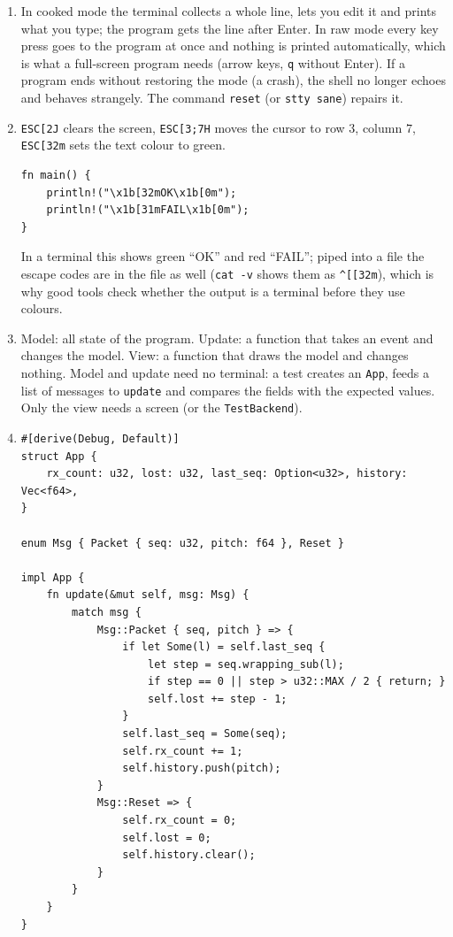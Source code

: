 \begin{enumerate}[label=\textbf{\ansnum.\arabic*}]
  \item In cooked mode the terminal collects a whole line, lets you edit it and prints what you type; the program gets the line after Enter. In raw mode every key press goes to the program at once and nothing is printed automatically, which is what a full-screen program needs (arrow keys, \verb!q! without Enter). If a program ends without restoring the mode (a crash), the shell no longer echoes and behaves strangely. The command \verb!reset! (or \verb!stty sane!) repairs it.
  \item \verb!ESC[2J! clears the screen, \verb!ESC[3;7H! moves the cursor to row $3$, column $7$, \verb!ESC[32m! sets the text colour to green.
\begin{verbatim}
fn main() {
    println!("\x1b[32mOK\x1b[0m");
    println!("\x1b[31mFAIL\x1b[0m");
}
\end{verbatim}
In a terminal this shows green ``OK'' and red ``FAIL''; piped into a file the escape codes are in the file as well (\verb!cat -v! shows them as \verb!^[[32m!), which is why good tools check whether the output is a terminal before they use colours.
  \item Model: all state of the program. Update: a function that takes an event and changes the model. View: a function that draws the model and changes nothing. Model and update need no terminal: a test creates an \verb!App!, feeds a list of messages to \verb!update! and compares the fields with the expected values. Only the view needs a screen (or the \verb!TestBackend!).
  \item
\begin{verbatim}
#[derive(Debug, Default)]
struct App {
    rx_count: u32, lost: u32, last_seq: Option<u32>, history: Vec<f64>,
}

enum Msg { Packet { seq: u32, pitch: f64 }, Reset }

impl App {
    fn update(&mut self, msg: Msg) {
        match msg {
            Msg::Packet { seq, pitch } => {
                if let Some(l) = self.last_seq {
                    let step = seq.wrapping_sub(l);
                    if step == 0 || step > u32::MAX / 2 { return; }
                    self.lost += step - 1;
                }
                self.last_seq = Some(seq);
                self.rx_count += 1;
                self.history.push(pitch);
            }
            Msg::Reset => {
                self.rx_count = 0;
                self.lost = 0;
                self.history.clear();
            }
        }
    }
}


\end{verbatim}
\end{enumerate}
